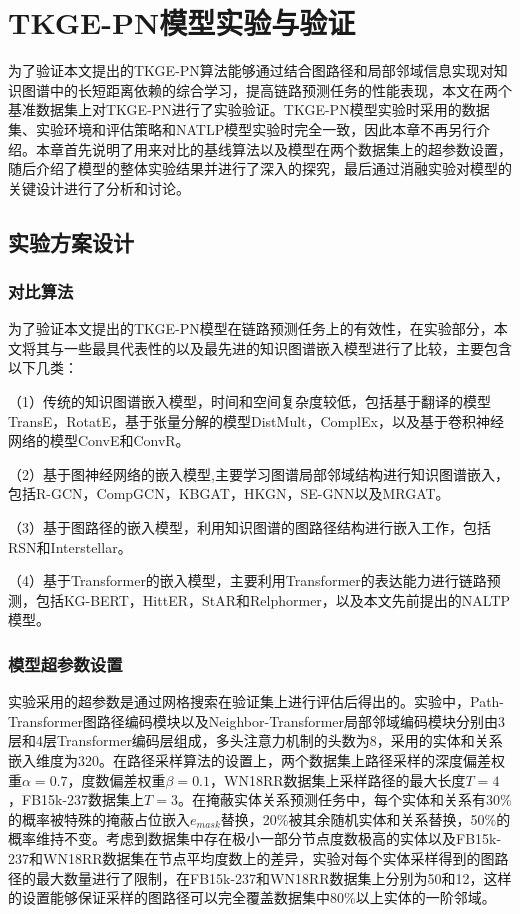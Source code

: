 \chapter{TKGE-PN模型实验与验证}
为了验证本文提出的TKGE-PN算法能够通过结合图路径和局部邻域信息实现对知识图谱中的长短距离依赖的综合学习，提高链路预测任务的性能表现，本文在两个基准数据集上对TKGE-PN进行了实验验证。TKGE-PN模型实验时采用的数据集、实验环境和评估策略和NATLP模型实验时完全一致，因此本章不再另行介绍。本章首先说明了用来对比的基线算法以及模型在两个数据集上的超参数设置，随后介绍了模型的整体实验结果并进行了深入的探究，最后通过消融实验对模型的关键设计进行了分析和讨论。

\section{实验方案设计}

\subsection{对比算法}

为了验证本文提出的TKGE-PN模型在链路预测任务上的有效性，在实验部分，本文将其与一些最具代表性的以及最先进的知识图谱嵌入模型进行了比较，主要包含以下几类：

（1）传统的知识图谱嵌入模型，时间和空间复杂度较低，包括基于翻译的模型TransE，RotatE，基于张量分解的模型DistMult，ComplEx，以及基于卷积神经网络的模型ConvE和ConvR。

（2）基于图神经网络的嵌入模型,主要学习图谱局部邻域结构进行知识图谱嵌入，包括R-GCN，CompGCN，KBGAT，HKGN，SE-GNN以及MRGAT。

（3）基于图路径的嵌入模型，利用知识图谱的图路径结构进行嵌入工作，包括RSN和Interstellar。 

（4）基于Transformer的嵌入模型，主要利用Transformer的表达能力进行链路预测，包括KG-BERT，HittER，StAR和Relphormer，以及本文先前提出的NALTP模型。

\subsection{模型超参数设置}

实验采用的超参数是通过网格搜索在验证集上进行评估后得出的。实验中，Path-Transformer图路径编码模块以及Neighbor-Transformer局部邻域编码模块分别由3层和4层Transformer编码层组成，多头注意力机制的头数为8，采用的实体和关系嵌入维度为320。在路径采样算法的设置上，两个数据集上路径采样的深度偏差权重$\alpha = 0.7$，度数偏差权重$\beta=0.1$，WN18RR数据集上采样路径的最大长度$T=4$，FB15k-237数据集上$T=3$。在掩蔽实体关系预测任务中，每个实体和关系有30\%的概率被特殊的掩蔽占位嵌入$e_{mask}$替换，20\%被其余随机实体和关系替换，50\%的概率维持不变。考虑到数据集中存在极小一部分节点度数极高的实体以及FB15k-237和WN18RR数据集在节点平均度数上的差异，实验对每个实体采样得到的图路径的最大数量进行了限制，在FB15k-237和WN18RR数据集上分别为50和12，这样的设置能够保证采样的图路径可以完全覆盖数据集中80\%以上实体的一阶邻域。

